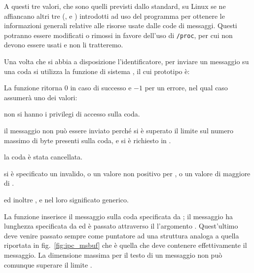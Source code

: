 A questi tre valori, che sono quelli previsti dallo standard, su Linux se ne
affiancano altri tre (,  e
) introdotti ad uso del programma  per ottenere le
informazioni generali relative alle risorse usate dalle code di
messaggi. Questi potranno essere modificati o rimossi in favore dell'uso di
\texttt{/proc}, per cui non devono essere usati e non li tratteremo.

Una volta che si abbia a disposizione l'identificatore, per inviare un
messaggio su una coda si utilizza la funzione di sistema , il
cui prototipo è:

\begin{funcproto}{
}

{La funzione ritorna $0$ in caso di successo e $-1$ per un errore, nel qual
  caso  assumerà uno dei valori: 
  \begin{errlist}
  \item[\errcode{EACCES}] non si hanno i privilegi di accesso sulla coda.
  \item[\errcode{EAGAIN}] il messaggio non può essere inviato perché si è
    superato il limite  sul numero massimo di byte presenti
    sulla coda, e si è richiesto  in .
  \item[\errcode{EIDRM}] la coda è stata cancellata.
  \item[\errcode{EINVAL}] si è specificato un  invalido, o un
    valore non positivo per , o un valore di 
    maggiore di .
  \end{errlist}
  ed inoltre ,  e  nel loro
  significato generico.}
\end{funcproto}

La funzione inserisce il messaggio sulla coda specificata da ; il
messaggio ha lunghezza specificata da  ed è passato attraverso il
l'argomento .  Quest'ultimo deve venire passato sempre come
puntatore ad una struttura  analoga a quella riportata in
fig.~\ref{fig:ipc_msbuf} che è quella che deve contenere effettivamente il
messaggio.  La dimensione massima per il testo di un messaggio non può
comunque superare il limite .

